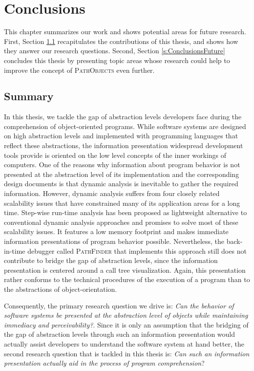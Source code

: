 \chapter{Conclusions}
\label{c:conclusions}
This chapter summarizes our work and shows potential areas for future research.
First, Section \ref{s:ConclusionsSummary} recapitulates the contributions of this thesis, and shows how they answer our research questions.
Second, Section \ref{s:ConclusionsFuture} concludes this thesis by presenting topic areas whose research could help to improve the concept of \textsc{PathObjects} even further. 

\section{Summary}
\label{s:ConclusionsSummary}
In this thesis, we tackle the gap of abstraction levels developers face during the comprehension of object-oriented programs.
While software systems are designed on high abstraction levels and implemented with programming languages that reflect these abstractions, the information presentation widespread development tools provide is oriented on the low level concepts of the inner workings of computers.
One of the reasons why information about program behavior is not presented at the abstraction level of its implementation and the corresponding design documents is that dynamic analysis is inevitable to gather the required information.
However, dynamic analysis suffers from four closely related scalability issues that have constrained many of its application areas for a long time.
Step-wise run-time analysis has been proposed as lightweight alternative to conventional dynamic analysis approaches and promises to solve most of these scalability issues.
It features a low memory footprint and makes immediate information presentations of program behavior possible.
Nevertheless, the back-in-time debugger called \textsc{PathFinder} that implements this approach still does not contribute to bridge the gap of abstraction levels, since the information presentation is centered around a call tree visualization.
Again, this presentation rather conforms to the technical procedures of the execution of a program than to the abstractions of object-orientation.

Consequently, the primary research question we drive is: \textit{Can the behavior of software systems be presented at the abstraction level of objects while maintaining immediacy and perceivability?}.
Since it is only an assumption that the bridging of the gap of abstraction levels through such an information presentation would actually assist developers to understand the software system at hand better, the second research question that is tackled in this thesis is:
\textit{Can such an information presentation actually aid in the process of program comprehension}?


